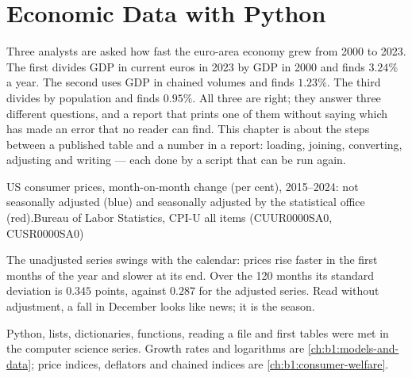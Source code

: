 \chapter{Economic Data with Python}\label{ch:b1:economic-data-python}

Three analysts are asked how fast the euro-area economy grew from 2000 to
2023. The first divides GDP in current euros in 2023 by GDP in 2000 and finds
$3.24\%$ a year. The second uses GDP in chained volumes and finds $1.23\%$. The
third divides by population and finds $0.95\%$. %
All three are right; they answer three different questions, and a report
that prints one of them without saying which has made an error that no
reader can find. This chapter is about the steps between a published
table and a number in a report: loading, joining, converting, adjusting
and writing --- each done by a script that can be run again.

\begin{openingchart}{US consumer prices, month-on-month change (per cent),
2015--2024: not seasonally adjusted (blue) and seasonally adjusted by the
statistical office (red).}{Bureau of Labor Statistics, CPI-U all items
(CUUR0000SA0, CUSR0000SA0)}
\end{openingchart}

The unadjusted series swings with the calendar: prices rise faster in the
first months of the year and slower at its end. Over the 120 months its
standard deviation is $0.345$ points, against $0.287$ for the adjusted series.
Read without adjustment, a fall in December looks like news; it is the
season.

\begin{recall}
Python, lists, dictionaries, functions, reading a file and first tables
were met in the computer science series. Growth rates and logarithms are
\cref{ch:b1:models-and-data}; price indices, deflators and chained
indices are \cref{ch:b1:consumer-welfare}.
\end{recall}

